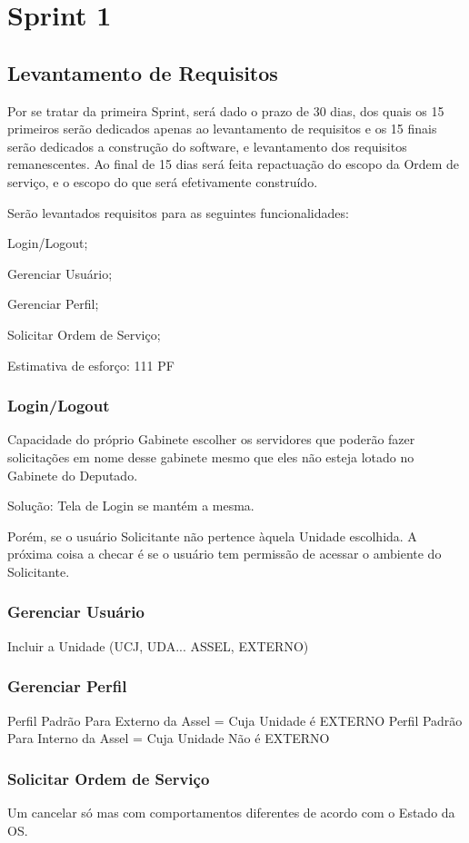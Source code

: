 \chapter{Sprint 1}

\section{Levantamento de Requisitos}

Por se tratar da primeira Sprint, será dado o prazo de 30 dias, dos quais os 15 primeiros serão dedicados apenas ao levantamento de requisitos e os 15 finais serão dedicados a construção do software, e levantamento dos requisitos remanescentes. Ao final de 15 dias será feita repactuação do escopo da Ordem de serviço, e o escopo do que será efetivamente construído.

Serão levantados requisitos para as seguintes funcionalidades:

Login/Logout;

Gerenciar Usuário;

Gerenciar Perfil;

Solicitar Ordem de Serviço;

Estimativa de esforço:  111 PF

\subsection{Login/Logout}

Capacidade do próprio Gabinete escolher os servidores que poderão fazer solicitações em nome desse gabinete mesmo que eles não esteja lotado no Gabinete do Deputado.

Solução: Tela de Login se mantém a mesma. 

Porém, se o usuário Solicitante não pertence àquela Unidade escolhida. A próxima coisa a checar é se o usuário tem permissão de acessar o ambiente do Solicitante.  

\subsection{Gerenciar Usuário}

Incluir a Unidade (UCJ, UDA... ASSEL, EXTERNO)


\subsection{Gerenciar Perfil}

Perfil Padrão Para Externo da Assel = Cuja Unidade é EXTERNO
Perfil Padrão Para Interno da Assel = Cuja Unidade Não é EXTERNO

\subsection{Solicitar Ordem de Serviço}

Um cancelar só mas com comportamentos diferentes de acordo com o Estado da OS.
	


	
